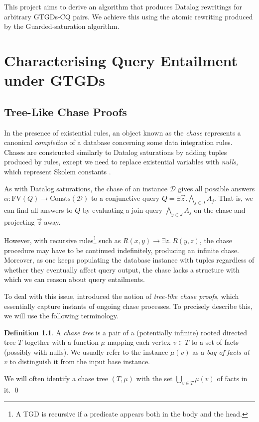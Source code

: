 \documentclass[12pt]{report}
\theoremstyle{plain}
\theoremstyle{definition}
\newtheorem{definition}[theorem]{Definition}
\def\FV{{\mathrm{FV}}}
\def\Consts{{\mathrm{Consts}}}
\begin{document}
This project aims to derive an algorithm that produces Datalog rewritings for arbitrary GTGDs-CQ pairs. We achieve this using the atomic rewriting produced by the Guarded-saturation algorithm.

\newpage
\chapter{Characterising Query Entailment under GTGDs}
\label{chapter:characterising-query-entailment-under-gtgds}

\section{Tree-Like Chase Proofs}

In the presence of existential rules, an object known as the \emph{chase} represents a canonical \emph{completion} of a database concerning some data integration rules. Chases are constructed similarly to Datalog saturations by adding tuples produced by rules, except we need to replace existential variables with \emph{nulls}, which represent Skolem constants \cite{fagin_kolaitis_miller_popa_2005}.

As with Datalog saturations, the chase of an instance $\mathcal{D}$ gives all possible answers $\alpha: \FV(Q) \rightarrow \Consts(\mathcal{D})$ to a conjunctive query $Q = \exists \vec{z}. \bigwedge_{j \in J} A_j$. That is, we can find all answers to $Q$ by evaluating a join query $\bigwedge_{j \in J} A_j$ on the chase and projecting $\vec{z}$ away.

However, with recursive rules\footnote{A TGD is recursive if a predicate appears both in the body and the head.} such as $R(x, y) \rightarrow \exists z.\ R(y, z)$, the chase procedure may have to be continued indefinitely, producing an infinite chase. Moreover, as one keeps populating the database instance with tuples regardless of whether they eventually affect query output, the chase lacks a structure with which we can reason about query entailments.

To deal with this issue, \cite{benedikt_buron_germano_kappelmann_motik_2022} introduced the notion of \emph{tree-like chase proofs}, which essentially capture instants of ongoing chase processes. To precisely describe this, we will use the following terminology.

\begin{definition}
  A \emph{chase tree} is a pair of a (potentially infinite) rooted directed tree $T$ together with a function $\mu$ mapping each vertex $v \in T$ to a set of facts (possibly with nulls). We usually refer to the instance $\mu(v)$ as a \emph{bag of facts at $v$} to distinguish it from the input base instance.
  
  We will often identify a chase tree $(T, \mu)$ with the set $\bigcup_{v \in T} \mu(v)$ of facts in it.
  \qed
\end{definition}
\end{document}
